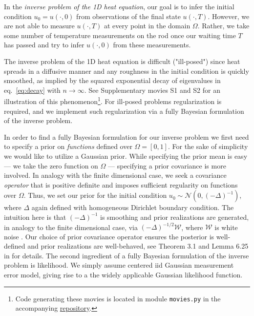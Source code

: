 In the \emph{inverse problem of the 1D heat equation}, our goal is to
infer the initial condition $u_0 = u(\cdot, 0)$ from observations of
the final state $u(\cdot, T)$. However, we are not able to measure
$u(\cdot, T)$ at every point in the domain $\Omega$. Rather, we take
some number of temperature measurements on the rod once our waiting
time $T$ has passed and try to infer $u(\cdot, 0)$ from these
measurements.

The inverse problem of the 1D heat equation is difficult ("ill-posed")
since heat spreads in a diffusive manner and any roughness in the
initial condition is quickly smoothed, as implied by the squared
exponential decay of eigenvalues in eq.~\eqref{eq:decay} with
$n\to\infty$. See Supplementary movies S1 and S2 for an illustration
of this phenomenon\footnote{Code generating these movies is located in
module \texttt{movies.py} in the accompanying
\href{https://github.com/yairdaon/OED}{repository}.}. For ill-posed
problems regularization is required, and we implement such
regularization via a fully Bayesian formulation of the inverse
problem.


In order to find a fully Bayesian formulation for our inverse problem
we first need to specify a prior on \emph{functions} defined over
$\Omega = [0,1]$. For the sake of simplicity we would like to utilize
a Gaussian prior. While specifying the prior mean is easy --- we take
the zero function on $\Omega$ --- specifying a prior covariance is
more involved. In analogy with the finite dimensional case, we seek a
covariance \emph{operator} that is positive definite and imposes
sufficient regularity on functions over $\Omega$. Thus, we set our
prior for the initial condition $u_0 \sim \mathcal{N}(0,
(-\Delta)^{-1})$, where $\Delta$ again defined with homogeneous
Dirichlet boundary condition. The intuition here is that
$(-\Delta)^{-1}$ is smoothing and prior realizations are generated, in
analogy to the finite dimensional case, via
$(-\Delta)^{-1/2}\mathcal{W}$, where $\mathcal{W}$ is white noise
\cite{rue2011}. Our choice of prior covariance operator ensures the
posterior is well-defined and prior realizations are well-behaved, see
Theorem 3.1 and Lemma 6.25 in \cite{Stuart10} for details. The second
ingredient of a fully Bayesian formulation of the inverse problem is
likelihood. We simply assume centered iid Gaussian measurement error
model, giving rise to a the widely applicable Gaussian likelihood
function.


